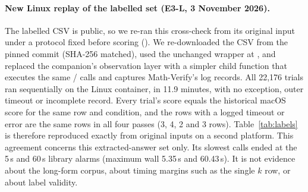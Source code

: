 \paragraph{New Linux replay of the labelled set (E3-L, 3 November 2026).} The labelled CSV is public, so we re-ran this cross-check from its original input under a protocol fixed before scoring (). We re-downloaded the CSV from the pinned commit (SHA-256 matched), used the unchanged  wrapper at , and replaced the companion's observation layer with a simpler child function that executes the same / calls and captures Math-Verify's log records. All 22,176 trials ran sequentially on the Linux container, in 11.9 minutes, with no exception, outer timeout or incomplete record. Every trial's score equals the historical macOS score for the same row and condition, and the rows with a logged timeout or error are the same rows in all four passes (3, 4, 2 and 3 rows). Table~\ref{tab:labels} is therefore reproduced exactly from original inputs on a second platform. This agreement concerns this extracted-answer set only. Its slowest calls ended at the 5\,s and 60\,s library alarms (maximum wall 5.35\,s and 60.43\,s). It is not evidence about the long-form corpus, about timing margins such as the single $k$ row, or about label validity.
